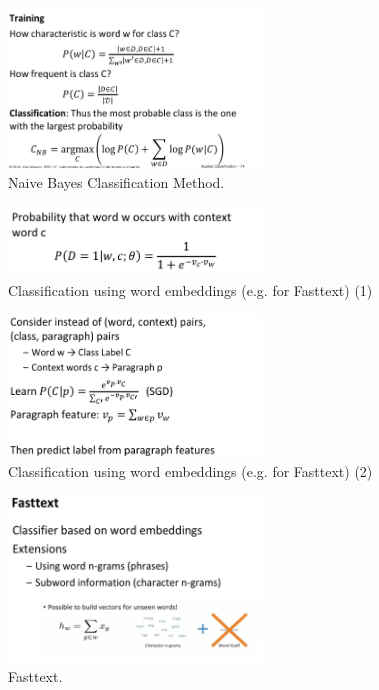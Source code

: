 \begin{figure}[htp]
  \centering
    \includegraphics[width=0.6\textwidth]{images/naiveb1.png}
    \caption{Naive Bayes Classification Method.}
    \label{fig:naiveb1}
\end{figure}

\begin{figure}[htp]
  \centering
    \includegraphics[width=0.6\textwidth]{images/classwe.png}
    \caption{Classification using word embeddings (e.g. for Fasttext) (1)}
    \label{fig:classwe}
\end{figure}
\begin{figure}[htp]
  \centering
    \includegraphics[width=0.6\textwidth]{images/classwe2.png}
    \caption{Classification using word embeddings (e.g. for Fasttext) (2)}
    \label{fig:classwe2}
\end{figure}

\begin{figure}[htp]
  \centering
    \includegraphics[width=0.6\textwidth]{images/ftft.png}
    \caption{Fasttext.}
    \label{fig:ftft}
\end{figure}

